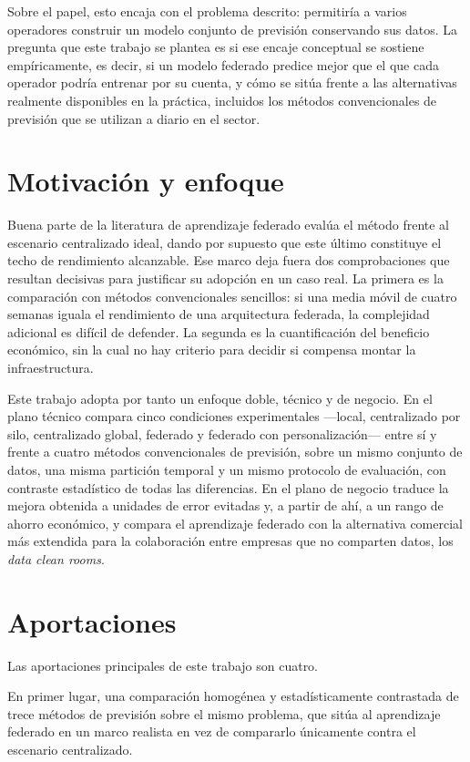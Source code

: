 Sobre el papel, esto encaja con el problema descrito: permitiría a varios operadores construir un
modelo conjunto de previsión conservando sus datos. La pregunta que este trabajo se plantea es si
ese encaje conceptual se sostiene empíricamente, es decir, si un modelo federado predice mejor que
el que cada operador podría entrenar por su cuenta, y cómo se sitúa frente a las alternativas
realmente disponibles en la práctica, incluidos los métodos convencionales de previsión que se
utilizan a diario en el sector.

\section{Motivación y enfoque}

Buena parte de la literatura de aprendizaje federado evalúa el método frente al escenario
centralizado ideal, dando por supuesto que este último constituye el techo de rendimiento
alcanzable. Ese marco deja fuera dos comprobaciones que resultan decisivas para justificar su
adopción en un caso real. La primera es la comparación con métodos convencionales sencillos: si
una media móvil de cuatro semanas iguala el rendimiento de una arquitectura federada, la
complejidad adicional es difícil de defender. La segunda es la cuantificación del beneficio
económico, sin la cual no hay criterio para decidir si compensa montar la infraestructura.

Este trabajo adopta por tanto un enfoque doble, técnico y de negocio. En el plano técnico compara
cinco condiciones experimentales —local, centralizado por silo, centralizado global, federado y
federado con personalización— entre sí y frente a cuatro métodos convencionales de previsión,
sobre un mismo conjunto de datos, una misma partición temporal y un mismo protocolo de evaluación,
con contraste estadístico de todas las diferencias. En el plano de negocio traduce la mejora
obtenida a unidades de error evitadas y, a partir de ahí, a un rango de ahorro económico, y compara
el aprendizaje federado con la alternativa comercial más extendida para la colaboración entre
empresas que no comparten datos, los \emph{data clean rooms}.

\section{Aportaciones}

Las aportaciones principales de este trabajo son cuatro.

En primer lugar, una comparación homogénea y estadísticamente contrastada de trece métodos de
previsión sobre el mismo problema, que sitúa al aprendizaje federado en un marco realista en vez de
compararlo únicamente contra el escenario centralizado.

